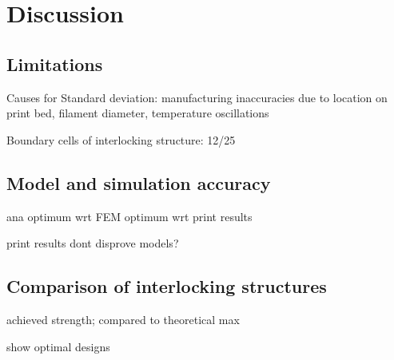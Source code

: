 \section{Discussion}

\subsection{Limitations}
Causes for Standard deviation: manufacturing inaccuracies due to location on print bed, filament diameter, temperature oscillations

Boundary cells of interlocking structure: 12/25

\subsection{Model and simulation accuracy}
ana optimum wrt FEM optimum wrt print results

print results dont disprove models?


\subsection{Comparison of interlocking structures}

achieved strength; compared to theoretical max

show optimal designs
